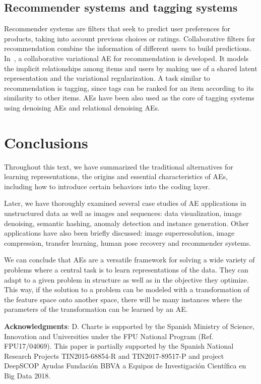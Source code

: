 \documentclass[
	fontsize=11pt, %
	twoside=false, %
	open=any, %
	secnumdepth=1, %
]{kaobook}
\begin{document}
\subsection{Recommender systems and tagging systems} Recommender systems are filters that seek to predict user preferences for products, taking into account previous choices or ratings. Collaborative filters for recommendation combine the information of different users to build predictions. In~\cite{li2017collaborative}, a collaborative variational AE for recommendation is developed. It models the implicit relationships among items and users by making use of a shared latent representation and the variational regularization. A task similar to recommendation is tagging, since tags can be ranked for an item according to its similarity to other items. AEs have been also used as the core of tagging systems~\cite{wang2015relational} using denoising AEs and relational denoising AEs.

\section{Conclusions}\label{sec:co}

Throughout this text, we have summarized the traditional alternatives for learning representations, the origins and essential characteristics of AEs, including how to introduce certain behaviors into the coding layer. 

Later, we have thoroughly examined several case studies of AE applications in unstructured data as well as images and sequences: data visualization, image denoising, semantic hashing, anomaly detection and instance generation. Other applications have also been briefly discussed: image superresolution, image compression, transfer learning, human pose recovery and recommender systems. 

We can conclude that AEs are a versatile framework for solving a wide variety of problems where a central task is to learn representations of the data. They can adapt to a given problem in structure as well as in the objective they optimize. This way, if the solution to a problem can be modeled with a transformation of the feature space onto another space, there will be many instances where the parameters of the transformation can be learned by an AE.

\textbf{Acknowledgments}: D. Charte is supported by the Spanish Ministry of Science, Innovation and Universities under the FPU National Program (Ref. FPU17/04069). This paper is partially supported by the Spanish National Research Projects TIN2015-68854-R and TIN2017-89517-P and project DeepSCOP Ayudas
Fundaci{\'o}n BBVA a Equipos de Investigaci{\'o}n Cient{\'i}fica en Big Data
2018.
\end{document}
